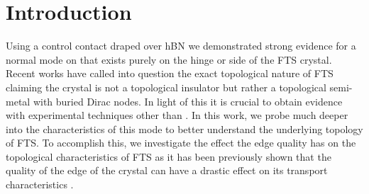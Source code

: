 \section{Introduction}
Using a control contact draped over \ac{hBN} we demonstrated strong evidence for a normal mode on that exists purely on the hinge or side of the \ac{FTS} crystal\cite{Gray2019}. Recent works have called into question the exact topological nature of \ac{FTS} claiming the crystal is not a topological insulator but rather a topological semi-metal with buried Dirac nodes. In light of this it is crucial to obtain evidence with experimental techniques other than . In this work, we probe much deeper into the characteristics of this mode to better understand the underlying topology of \ac{FTS}. To accomplish this, we investigate the effect the edge quality has on the topological characteristics of \ac{FTS} as it has been previously shown that the quality of the edge of the crystal can have a drastic effect on its transport characteristics . 

